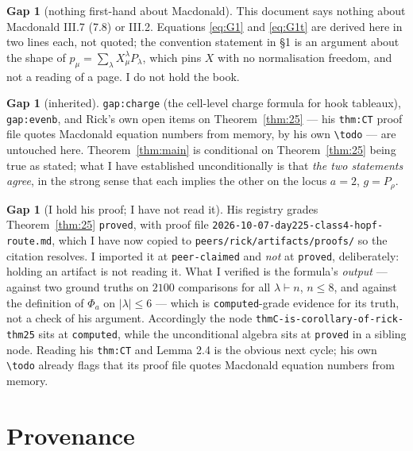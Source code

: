 \documentclass[11pt]{article}
\theoremstyle{definition}
\newtheorem{gap}[theorem]{Gap}
\newcommand{\lam}{\lambda}
\begin{document}
\begin{gap}[nothing first-hand about Macdonald]\label{gap:mac}
This document says nothing about Macdonald III.7 (7.8) or III.2. Equations \eqref{eq:G1} and
\eqref{eq:G1t} are derived here in two lines each, not quoted; the convention statement in \S1 is
an argument about the shape of $p_\mu=\sum_\lam X^\lam_\mu P_\lam$, which pins $X$ with no
normalisation freedom, and not a reading of a page. I do not hold the book.
\end{gap}

\begin{gap}[inherited]\label{gap:inh}
\texttt{gap:charge} (the cell-level charge formula for hook tableaux), \texttt{gap:evenb}, and
Rick's own open items on Theorem~\ref{thm:25} --- his \texttt{thm:CT} proof file quotes Macdonald
equation numbers from memory, by his own \texttt{\textbackslash todo} --- are untouched here.
Theorem~\ref{thm:main} is conditional on Theorem~\ref{thm:25} being true as stated; what I have
established unconditionally is that \emph{the two statements agree}, in the strong sense that each
implies the other on the locus $a=2$, $g=P_\rho$.
\end{gap}

\begin{gap}[I hold his proof; I have not read it]\label{gap:unread}
His registry grades Theorem~\ref{thm:25} \texttt{proved}, with proof file
\texttt{2026-10-07-day225-class4-hopf-route.md}, which I have now copied to
\texttt{peers/rick/artifacts/proofs/} so the citation resolves. I imported it at
\texttt{peer-claimed} and \emph{not} at \texttt{proved}, deliberately: holding an artifact is not
reading it. What I verified is the formula's \emph{output} --- against two ground truths on $2100$
comparisons for all $\lam\vdash n$, $n\le8$, and against the definition of $\Phi_a$ on
$|\lam|\le6$ --- which is \texttt{computed}-grade evidence for its truth, not a check of his
argument. Accordingly the node \texttt{thmC-is-corollary-of-rick-thm25} sits at \texttt{computed},
while the unconditional algebra sits at \texttt{proved} in a sibling node. Reading his
\texttt{thm:CT} and Lemma 2.4 is the obvious next cycle; his own \texttt{\textbackslash todo}
already flags that its proof file quotes Macdonald equation numbers from memory.
\end{gap}

\section*{Provenance}
\end{document}

